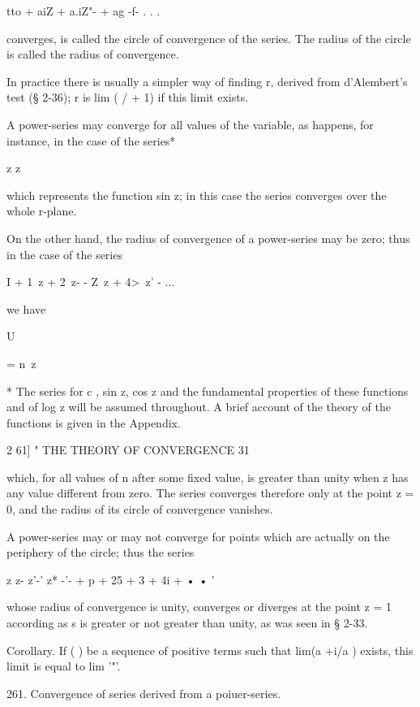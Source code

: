 tto + aiZ + a.iZ"- + ag -f- . . .

converges, is called the circle of convergence of the series. The
radius of the circle is called the radius of convergence.

In practice there is usually a simpler way of finding r, derived from
d'Alembert's test (§ 2-36); r is lim ( / + 1) if this limit exists.

A power-series may converge for all values of the variable, as
happens, for instance, in the case of the series*

z z

which represents the function sin z; in this case the series
converges over the whole r-plane.

On the other hand, the radius of convergence of a power-series may be
zero; thus in the case of the series

I + 1\ z + 2\ z- - Z\ z + 4>\ z' - ...



we have



U



= n\ z



* The series for c , sin z, cos z and the fundamental properties of
these functions and of log z will be assumed throughout. A brief
account of the theory of the functions is given in the Appendix.



2 61] " THE THEORY OF CONVERGENCE 31

which, for all values of n after some fixed value, is greater than
unity when z has any value different from zero. The series converges
therefore only at the point z = 0, and the radius of its circle of
convergence vanishes.

A power-series may or may not converge for points which are actually
on the periphery of the circle; thus the series

z z- z'-' z* -'- + p + 25 + 3 + 4i + • • '

whose radius of convergence is unity, converges or diverges at the
point z = 1 according as s is greater or not greater than unity, as
was seen in § 2-33.

Corollary. If ( ) be a sequence of positive terms such that lim(a +i/a
) exists, this limit is equal to lim '"'.

261. Convergence of series derived from a poiuer-series.

